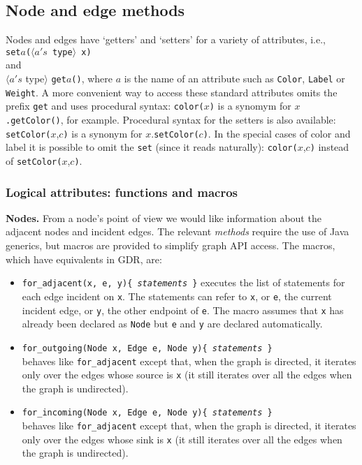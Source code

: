 \subsection{Node and edge methods}

Nodes and edges have `getters' and `setters' for
a variety of attributes, i.e.,
\\
\texttt{set}$a$\texttt{($\langle a's$ type$\rangle$ x)}
\\
and
\\
$\langle a's$ type$\rangle$ \texttt{get}$a$\texttt{()},
where $a$ is the name of an attribute such as
\texttt{Color},
\texttt{Label} or \texttt{Weight}.
A more convenient way to access these standard attributes omits the prefix \texttt{get}
and uses procedural syntax:
\texttt{color(}$x$\texttt{)} is a synomym for $x$\texttt{.getColor()}, for example.
Procedural syntax for the setters is also available:
\texttt{setColor(}$x$,$c$\texttt{)} is a synonym for $x$.\texttt{setColor(}$c$\texttt{)}.
In the special cases of color and label it is possible to omit the \texttt{set}
(since it reads naturally): \texttt{color(}$x$,$c$\texttt{)} instead of \texttt{setColor(}$x$,$c$\texttt{)}.

\subsubsection*{Logical attributes: functions and macros}

\textbf{Nodes.}
From a node's point of view we would like information about the adjacent nodes and incident edges.
The relevant \emph{methods} require the use of Java generics, but macros are provided
to simplify graph API access. The macros, which have equivalents in GDR, are:

\begin{itemize}

\item
\texttt{for\_adjacent(x, e, y)\{ \emph{statements} \}}
executes the list of statements for each edge incident on \verb$x$.
The statements can refer to \verb$x$, or \verb$e$, the current incident edge,
or \verb$y$, the other endpoint of \verb$e$.
The macro assumes that \texttt{x} has already been declared as \texttt{Node}
but \texttt{e} and \texttt{y} are declared automatically.

\item
\texttt{for\_outgoing(Node x, Edge e, Node y)\{ \emph{statements} \}}\\
behaves like \texttt{for\_adjacent} except that, when the graph is directed,
it iterates only over the edges whose source is \verb$x$ (it still iterates over all the edges when the graph is undirected). 

\item
\texttt{for\_incoming(Node x, Edge e, Node y)\{ \emph{statements} \}}\\
behaves like \texttt{for\_adjacent} except that, when the graph is directed,
it iterates only over the edges whose sink is \verb$x$ (it still iterates over all the edges when the graph is undirected). 

\end{itemize}

